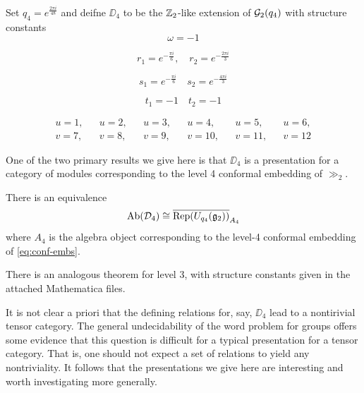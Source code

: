 \begin{definition}
    Set $q_4 = e^{\frac{2\pi i}{48}}$ and deifne $\DD_4$ to be the $\mathbb{Z}_2$-like extension of $\mathcal{G}_2(q_4)$ with structure constants
    \begin{equation*}
    \omega = -1
    \end{equation*}

    \begin{equation*}
        r_1 = e^{-\frac{\pi i}{6}}, \quad r_2 = e^{-\frac{2\pi i}{3}}
    \end{equation*}

    \begin{equation*}
        s_1 = e^{-\frac{\pi i}{6}} \quad s_2 = e^{-\frac{4\pi i}{3}}
    \end{equation*}

    \begin{equation*}
        t_1 = -1 \quad t_2 = -1
    \end{equation*}

    \begin{align*}
        u = 1, && u = 2, && u = 3, && u = 4, && u = 5, && u = 6, \\
        v = 7, && v = 8, && v = 9, && v = 10, && v = 11, && v = 12 
    \end{align*}


\end{definition}



One of the two primary results we give here is that $\DD_4$ is a presentation for a category of modules corresponding to the
level 4 conformal embedding of $\gg_2$.
\begin{theorem}
    There is an equivalence
    \[
        \operatorname{Ab}(\mathcal{D}_4) \cong \overline{\operatorname{Rep}(U_{q_4}(\mathfrak{g}_2))}_{A_4}
    \]
    where $A_4$ is the algebra object corresponding to the level-4 conformal embedding of \ref{eq:conf-embs}.
\end{theorem}
There is an analogous theorem for level 3, with structure constants given in the attached Mathematica files.

It is not clear a priori that the defining relations for, say, $\DD_4$ lead to a nontirivial tensor category.
The general undecidability of the word problem for groups offers some evidence that this question is difficult
for a typical presentation for a tensor category.
That is, one should not expect a set of relations to yield any nontriviality.
It follows that the presentations we give here are interesting and worth investigating more generally.

